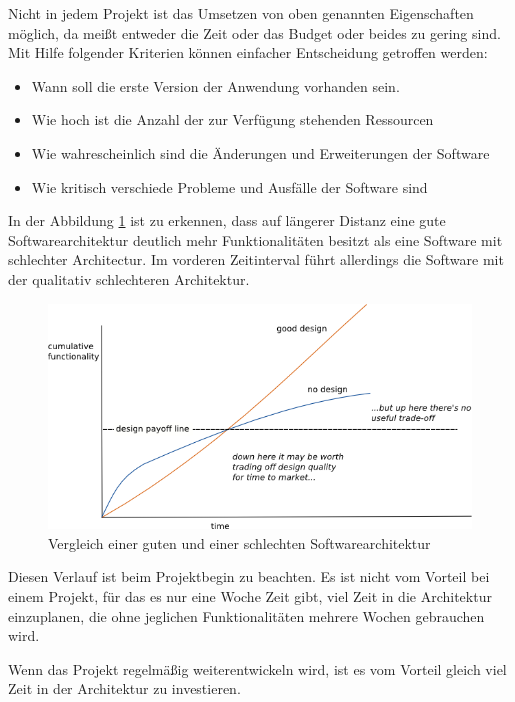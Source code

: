     Nicht in jedem Projekt ist das Umsetzen von oben genannten Eigenschaften möglich, 
    da meißt entweder die Zeit oder das Budget oder beides zu gering sind.
    Mit Hilfe folgender Kriterien können einfacher Entscheidung getroffen werden:
    \begin{itemize}
        \item Wann soll die erste Version der Anwendung vorhanden sein.
        \item Wie hoch ist die Anzahl der zur Verfügung stehenden Ressourcen
        \item Wie wahrescheinlich sind die Änderungen und Erweiterungen der Software
        \item Wie kritisch verschiede Probleme und Ausfälle der Software sind 
    \end{itemize}

    In der Abbildung \ref{fig:softQuality} ist zu erkennen, dass auf längerer Distanz eine gute Softwarearchitektur deutlich mehr Funktionalitäten 
    besitzt als eine Software mit schlechter Architectur. Im vorderen Zeitinterval führt allerdings die Software mit der qualitativ schlechteren Architektur.
    \begin{figure}[H]
        \centering
        \includegraphics[width=1\textwidth]{./images/QASoftwareCompare.png}
        \caption[Vergleich einer guten und einer schlechten Softwarearchitektur]{Vergleich einer guten und einer schlechten Softwarearchitektur \footnotemark}
        \label{fig:softQuality}
    \end{figure}
    Diesen Verlauf ist beim Projektbegin zu beachten. Es ist nicht vom Vorteil bei einem Projekt, 
    für das es nur eine Woche Zeit gibt, viel Zeit in die Architektur einzuplanen, die ohne jeglichen Funktionalitäten mehrere Wochen gebrauchen wird.

    Wenn das Projekt regelmäßig weiterentwickeln wird, ist es vom Vorteil gleich viel Zeit in der Architektur zu investieren.
